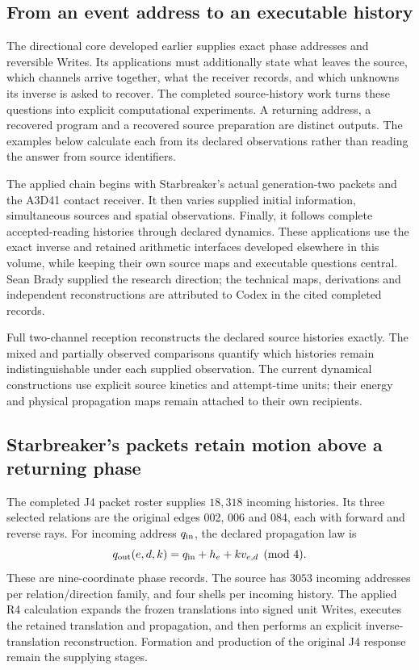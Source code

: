 \label{v3-applications-history}

\subsection{From an event address to an executable history}

The directional core developed earlier supplies exact phase addresses and reversible Writes. Its applications must additionally state what leaves the source, which channels arrive together, what the receiver records, and which unknowns its inverse is asked to recover. The completed source-history work turns these questions into explicit computational experiments. A returning address, a recovered program and a recovered source preparation are distinct outputs. The examples below calculate each from its declared observations rather than reading the answer from source identifiers.

The applied chain begins with Starbreaker's actual generation-two packets and the A3D41 contact receiver. It then varies supplied initial information, simultaneous sources and spatial observations. Finally, it follows complete accepted-reading histories through declared dynamics. These applications use the exact inverse and retained arithmetic interfaces developed elsewhere in this volume, while keeping their own source maps and executable questions central. Sean Brady supplied the research direction; the technical maps, derivations and independent reconstructions are attributed to Codex in the cited completed records.

Full two-channel reception reconstructs the declared source histories exactly. The mixed and partially observed comparisons quantify which histories remain indistinguishable under each supplied observation. The current dynamical constructions use explicit source kinetics and attempt-time units; their energy and physical propagation maps remain attached to their own recipients.

\subsection{Starbreaker's packets retain motion above a returning phase}

The completed J4 packet roster supplies $18{,}318$ incoming histories. Its three selected relations are the original edges 002, 006 and 084, each with forward and reverse rays. For incoming address $q_{\rm in}$, the declared propagation law is
\[
 q_{\rm out}(e,d,k)=q_{\rm in}+h_e+kv_{e,d}
 \pmod4.
\]
These are nine-coordinate phase records. The source has $3053$ incoming addresses per relation/direction family, and four shells per incoming history. The applied R4 calculation expands the frozen translations into signed unit Writes, executes the retained translation and propagation, and then performs an explicit inverse-translation reconstruction. Formation and production of the original J4 response remain the supplying stages. 

